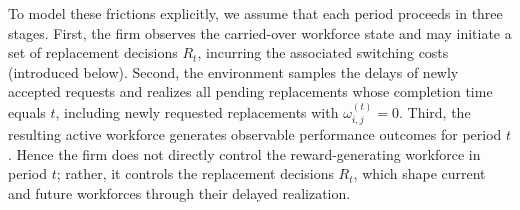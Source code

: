 \documentclass[opre,blindrev]{informs3}
\begin{document}
To model these frictions explicitly, we assume that each period proceeds in three stages. First, the firm observes the carried-over workforce state and may initiate a set of replacement decisions \(R_t\), incurring the associated switching costs (introduced below). Second, the environment samples the delays of newly accepted requests and realizes all pending replacements whose completion time equals \(t\), including newly requested replacements with \(\omega_{i,j}^{(t)}=0\). Third, the resulting active workforce generates observable performance outcomes for period \(t\). Hence the firm does not directly control the reward-generating workforce in period \(t\); rather, it controls the replacement decisions \(R_t\), which shape current and future workforces through their delayed realization.

\end{document}
